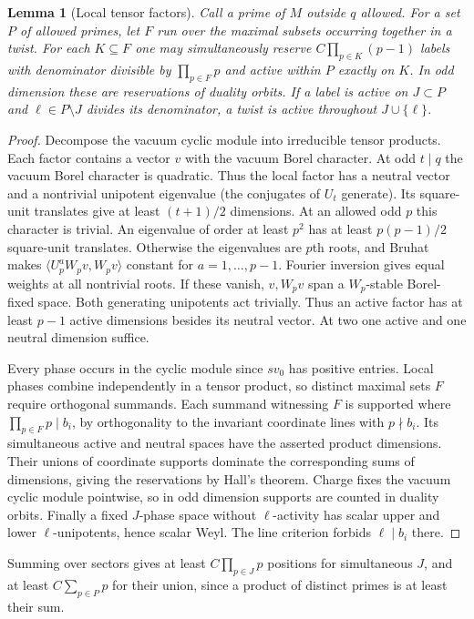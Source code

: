 \documentclass[11pt]{amsart}
\numberwithin{equation}{section}
\newtheorem{lemma}[theorem]{Lemma}
\theoremstyle{definition}
\theoremstyle{plain}
\begin{document}
\begin{lemma}[Local tensor factors]\label{result:spherical}
Call a prime of $M$ outside $q$ allowed. For a set $P$ of allowed
primes, let $F$ run over the maximal subsets occurring together in
a twist. For each $K\subseteq F$ one may simultaneously reserve
$C\prod_{p\in K}(p-1)$ labels with denominator divisible by
$\prod_{p\in F}p$ and active within $P$ exactly on $K$. In odd
dimension these are reservations of duality orbits. If a label is
active on $J\subset P$ and $\ell\in P\setminus J$ divides its
denominator, a twist is active throughout $J\cup\{\ell\}$.
\end{lemma}
\begin{proof}
Decompose the vacuum cyclic module into irreducible tensor products.
Each factor contains a vector $v$ with the vacuum Borel character.
At odd $t\mid q$ the vacuum Borel character is quadratic.
Thus the local factor has a neutral vector and a nontrivial
unipotent eigenvalue (the conjugates of $U_t$ generate). Its
square-unit translates give at least $(t+1)/2$ dimensions. At an allowed odd $p$ this character is trivial. An eigenvalue of order at least $p^2$
has at least $p(p-1)/2$ square-unit translates.
Otherwise the eigenvalues are $p$th roots, and Bruhat makes
$\langle U_p^aW_pv,W_pv\rangle$ constant for $a=1,\ldots,p-1$.
Fourier inversion gives equal weights at all nontrivial roots.
If these vanish, $v,W_pv$ span a $W_p$-stable Borel-fixed space.
Both generating unipotents act trivially. Thus an active factor has
at least $p-1$ active dimensions besides its neutral vector. At two
one active and one neutral dimension suffice.

Every phase occurs in the cyclic module since $sv_0$ has positive
entries. Local phases combine independently in a tensor product,
so distinct maximal sets $F$ require orthogonal summands. Each
summand witnessing $F$ is supported where $\prod_{p\in F}p\mid b_i$,
by orthogonality to the invariant coordinate lines with $p\nmid b_i$.
Its simultaneous active and neutral spaces have the asserted product
dimensions. Their unions of coordinate supports dominate the
corresponding sums of dimensions, giving the reservations by Hall's
theorem. Charge fixes the vacuum cyclic module pointwise, so in odd
dimension supports are counted in duality orbits. Finally a fixed $J$-phase space without $\ell$-activity
has scalar upper and lower $\ell$-unipotents, hence scalar Weyl.
The line criterion forbids $\ell\mid b_i$ there.
\end{proof}
Summing over sectors gives at least $C\prod_{p\in J}p$ positions
for simultaneous $J$, and at least $C\sum_{p\in P}p$ for their
union, since a product of distinct primes is at least their sum.
\end{document}
